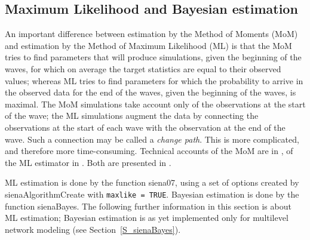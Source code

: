 \documentclass[a4paper,fleqn,11pt]{article}
\newcommand{\+}{\, + \,}
\newcommand{\sfn}[1]{\textsf{#1}}
\begin{document}
\subsection{Maximum Likelihood and Bayesian estimation}
\label{S_ML}
\label{S_Bayes}

An important difference between estimation by the Method of Moments (MoM)
and estimation by the Method of Maximum Likelihood (ML) is that
the MoM tries to find parameters that will produce simulations,
given the beginning of the waves, for which
on average the target statistics are equal to their observed values;
whereas ML tries to find parameters for which the probability to arrive
in the observed data for the end of the waves, given the beginning
of the waves, is maximal. The MoM simulations take account only of the
observations at the start of the wave; the ML simulations
augment the data by connecting the
observations at the start of each wave with the observation at the end of the wave.
Such a connection may be called a \emph{change path}.
This is more complicated, and therefore more time-consuming.
Technical accounts of the MoM are in \citet{Snijders01,SnijdersEA07},
of the ML estimator in \citet{SnijdersEA10a}.
Both are presented in \citet{Snijders2017}.
\bigskip

ML estimation is done by the function \sfn{siena07}, using a set of options
created by \sfn{sienaAlgorithmCreate} with \texttt{maxlike = TRUE}.
Bayesian estimation is done by the function \sfn{sienaBayes}.
The following further information in this section is about ML estimation;
Bayesian estimation is as yet implemented only for multilevel network modeling
(see Section~\ref{S_sienaBayes}).
\end{document}
